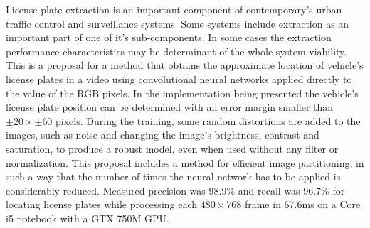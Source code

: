 
License plate extraction is an important component of contemporary's urban
traffic control and surveillance systems. 
Some systems include extraction as an important part of one of it's
sub-components.
In some cases the extraction performance characteristics may be determinant
of the whole system viability.
This is a proposal for a method that obtains the approximate location of
vehicle's license plates
in a video using convolutional neural networks applied directly to
the value of the RGB pixels.
In the implementation being presented the vehicle's license plate position can
be determined with an error margin smaller than $ \pm 20 \times \pm 60 $
pixels. During the training, some random distortions are
added to the images, such as noise and changing the image's brightness,
contrast and saturation, to produce a robust model, even when used without any
filter or normalization. This proposal includes a method for efficient image
partitioning, in such a way that the number of times the neural network has to
be applied is considerably reduced.
Measured precision was 98.9\% and recall was 96.7\% for locating license
plates while processing each $480 \times 768$ frame in 67.6ms on
a Core i5 notebook with a GTX 750M GPU.
